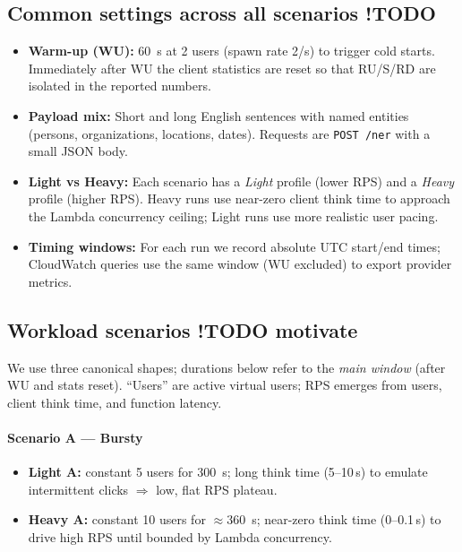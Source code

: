 \documentclass[11pt,a4paper]{article}
\begin{document}
\subsection{Common settings across all scenarios !TODO}
\begin{itemize}
  \item \textbf{Warm-up (WU):} \SI{60}{s} at 2 users (spawn rate 2/s) to trigger cold starts. Immediately after WU the client statistics are reset so that RU/S/RD are isolated in the reported numbers.
  \item \textbf{Payload mix:} Short and long English sentences with named entities (persons, organizations, locations, dates). Requests are \texttt{POST /ner} with a small JSON body.
  \item \textbf{Light vs Heavy:} Each scenario has a \emph{Light} profile (lower RPS) and a \emph{Heavy} profile (higher RPS). Heavy runs use near-zero client think time to approach the Lambda concurrency ceiling; Light runs use more realistic user pacing.
  \item \textbf{Timing windows:} For each run we record absolute UTC start/end times; CloudWatch queries use the same window (WU excluded) to export provider metrics.
\end{itemize}

\subsection{Workload scenarios !TODO motivate}
We use three canonical shapes; durations below refer to the \emph{main window} (after WU and stats reset). ``Users'' are active virtual users; RPS emerges from users, client think time, and function latency.

\paragraph{Scenario A — Bursty}
\begin{itemize}
  \item \textbf{Light A:} constant 5 users for \SI{300}{s}; long think time (5–10\,s) to emulate intermittent clicks $\Rightarrow$ low, flat RPS plateau.
  \item \textbf{Heavy A:} constant 10 users for $\approx$\SI{360}{s}; near-zero think time (0–0.1\,s) to drive high RPS until bounded by Lambda concurrency.
\end{itemize}
\end{document}
